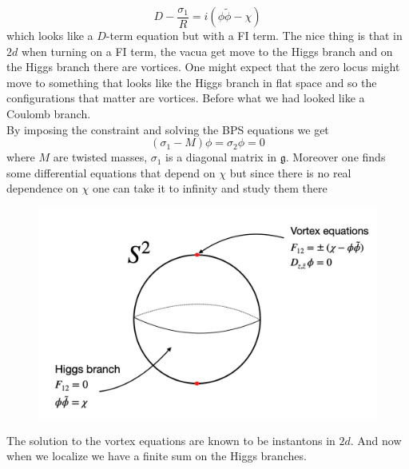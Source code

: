 \documentclass[11pt]{article}
\theoremstyle{definition}
\numberwithin{equation}{section}
\begin{document}
\begin{equation}
	D-\frac{\sigma_{1}}{R}=i(\phi\tilde{\phi}-\chi)
\end{equation}
which looks like a $D$-term equation but with a FI term. The nice thing is that in $2d$ when turning on a FI term, the vacua get move to the Higgs branch and on the Higgs branch there are vortices. One might expect that the zero locus might move to something that looks like the Higgs branch in flat space and so the configurations that matter are vortices. Before what we had looked like a Coulomb branch.\\
By imposing the constraint and solving the BPS equations we get
\begin{equation}
	(\sigma_{1}-M)\phi = \sigma_{2}\phi=0
\end{equation}
where $M$ are twisted masses, $\sigma_{1}$ is a diagonal matrix in $\mathfrak{g}$. Moreover one finds some differential equations that depend on $\chi$ but since there is no real dependence on $\chi$ one can take it to infinity and study them there
\begin{figure}[H]
\centering
\includegraphics[width=.7\textwidth]{sol.png}
\end{figure}
The solution to the vortex equations are known to be instantons in $2d$. And now when we localize we have a finite sum on the Higgs branches. 
\end{document}
